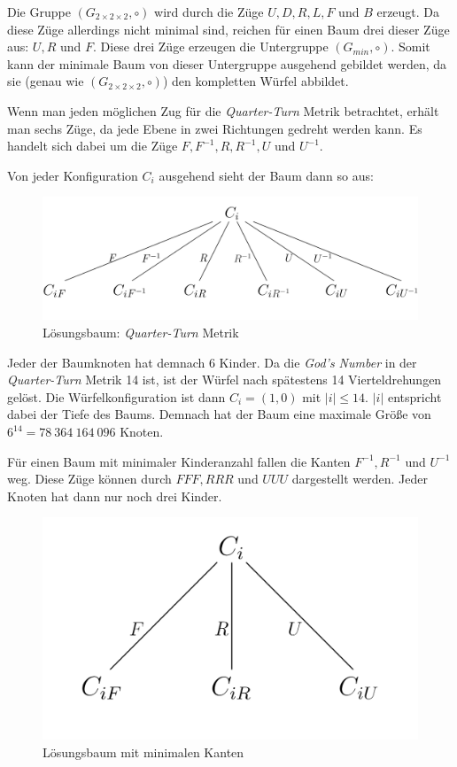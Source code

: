 \documentclass[12pt,a4paper, usenames, dvipsnames]{article}
\theoremstyle{mystyle}
\theoremstyle{definition}
\newcommand{\Gtwo}{\ensuremath{G_{2\times 2\times 2}}}
\begin{document}
Die Gruppe $(\Gtwo, \circ)$ wird durch die Züge $U, D, R, L, F$ und $B$ erzeugt. Da diese Züge allerdings nicht minimal sind, reichen für einen Baum drei dieser Züge aus: $U, R$ und $F$. Diese drei Züge erzeugen die Untergruppe $(G_{min}, \circ)$. Somit kann der minimale Baum von dieser Untergruppe ausgehend gebildet werden, da sie (genau wie $(\Gtwo, \circ)$) den kompletten Würfel abbildet.

Wenn man jeden möglichen Zug für die \textit{Quarter-Turn} Metrik betrachtet, erhält man sechs Züge, da jede Ebene in zwei Richtungen gedreht werden kann. Es handelt sich dabei um die Züge $F, F^{-1}, R, R^{-1}, U$ und $U^{-1}$.

Von jeder Konfiguration $C_i$ ausgehend sieht der Baum dann so aus:

\begin{figure}[H]
\centering
\includegraphics[scale=1.5]{Baum_1.jpg}
\caption{Lösungsbaum: \textit{Quarter-Turn} Metrik}
\label{Abbildung_BaumQTM}
\end{figure}

Jeder der Baumknoten hat demnach 6 Kinder. Da die \textit{God's Number} in der \textit{Quarter-Turn} Metrik 14 ist, ist der Würfel nach spätestens 14 Vierteldrehungen gelöst. Die Würfelkonfiguration ist dann $C_i = (1, 0)$ mit $|i| \leq 14$. $|i|$ entspricht dabei der Tiefe des Baums. Demnach hat der Baum eine maximale Größe von $6^{14} = 78 \ 364 \ 164 \ 096$ Knoten.

Für einen Baum mit minimaler Kinderanzahl fallen die Kanten $F^{-1}, R^{-1}$ und $U^{-1}$ weg. Diese Züge können durch $FFF, RRR$ und $UUU$ dargestellt werden. Jeder Knoten hat dann nur noch drei Kinder. 

\begin{figure}[H]
\centering
\includegraphics[scale=0.45]{Baum_2.jpg}
\caption{Lösungsbaum mit minimalen Kanten}
\label{Abbildung_BaumMin}
\end{figure}
\end{document}

